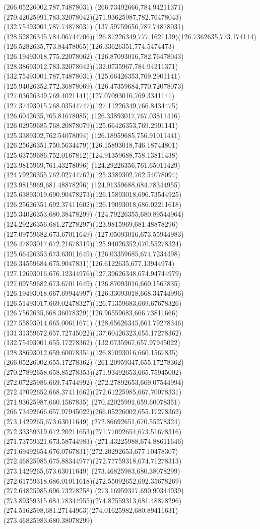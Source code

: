 {{\lineto(266.05226002,787.74878031)
\curveto(266.73492666,784.94211371)(270.42025991,783.32078042)(271.93625987,782.76478043)
\moveto(132.75493001,787.74878031)
\lineto(137.59759656,787.74878031)
\curveto(128.52826345,784.06744706)(126.87226349,777.1621139)(126.7362635,773.174114)
\curveto(126.5282635,773.84478065)(126.33626351,774.5474473)(126.19493018,775.22078062)
\lineto(126.87093016,782.76478043)
\curveto(128.38693012,783.32078042)(132.0735967,784.94211371)(132.75493001,787.74878031)
\moveto(125.66426353,769.2901141)
\lineto(125.94026352,772.36878069)
\curveto(126.47359684,770.72078073)(127.03626349,769.4021141)(127.07093016,769.3341141)
\curveto(127.37493015,768.03544747)(127.11226349,766.8434475)(126.6042635,765.81678085)
\curveto(126.33893017,767.03811416)(126.02959685,768.20878079)(125.66426353,769.2901141)
\moveto(125.3389302,762.54078094)
\curveto(126.18959685,756.91011441)(126.25626351,750.5634479)(126.15893018,746.18744801)
\curveto(125.63759686,752.0167812)(124.91359688,758.13811438)(123.9815969,761.43278096)
\curveto(124.29226356,761.65011429)(124.79226355,762.02744762)(125.3389302,762.54078094)
\moveto(123.9815969,681.48878296)
\curveto(124.91359688,684.78344955)(125.63893019,690.90478273)(126.15893018,696.73544925)
\curveto(126.25626351,692.37411602)(126.19093018,686.02211618)(125.34026353,680.38478299)
\curveto(124.79226355,680.89544964)(124.29226356,681.27278297)(123.9815969,681.48878296)
\moveto(127.09759682,673.67011649)
\curveto(127.05093016,673.55944983)(126.47893017,672.21678319)(125.94026352,670.55278324)
\lineto(125.66426353,673.63011649)
\curveto(126.03359685,674.7234498)(126.34559684,675.9047831)(126.6122635,677.13944974)
\curveto(127.12693016,676.12344976)(127.39626348,674.94744979)(127.09759682,673.67011649)
\moveto(126.87093016,660.1567835)
\lineto(126.19493018,667.69944997)
\curveto(126.33093018,668.34744996)(126.51493017,669.02478327)(126.71359683,669.67678326)
\curveto(126.7562635,668.36078329)(126.96559683,666.73811666)(127.55893014,665.00611671)
\curveto(128.65626345,661.79278346)(131.31359672,657.72745022)(137.60426323,655.17278362)
\lineto(132.75493001,655.17278362)
\curveto(132.0735967,657.97945022)(128.38693012,659.60078351)(126.87093016,660.1567835)
\moveto(266.05226002,655.17278362)
\lineto(261.20959347,655.17278362)
\curveto(270.27892658,658.85278353)(271.93492653,665.75945002)(272.07225986,669.74744992)
\curveto(272.27892653,669.07544994)(272.47092652,668.37411662)(272.61225985,667.70078331)
\lineto(271.93625987,660.1567835)
\curveto(270.42025991,659.60078351)(266.73492666,657.97945022)(266.05226002,655.17278362)
\moveto(273.1429265,673.63011649)
\lineto(272.86692651,670.55278324)
\curveto(272.33359319,672.20211653)(271.77092654,673.51678316)(271.73759321,673.58744983)
\curveto(271.43225988,674.88611646)(271.69492654,676.0767831)(272.20292653,677.10478307)
\curveto(272.46825985,675.88344977)(272.77759318,674.71278313)(273.1429265,673.63011649)
\moveto(273.46825983,680.38078299)
\curveto(272.61759318,686.01011618)(272.55092652,692.35678269)(272.64825985,696.73278258)
\curveto(273.16959317,690.90344939)(273.89359315,684.78344955)(274.82559313,681.48878296)
\curveto(274.5162598,681.27144963)(274.01625982,680.89411631)(273.46825983,680.38078299)
}
}
